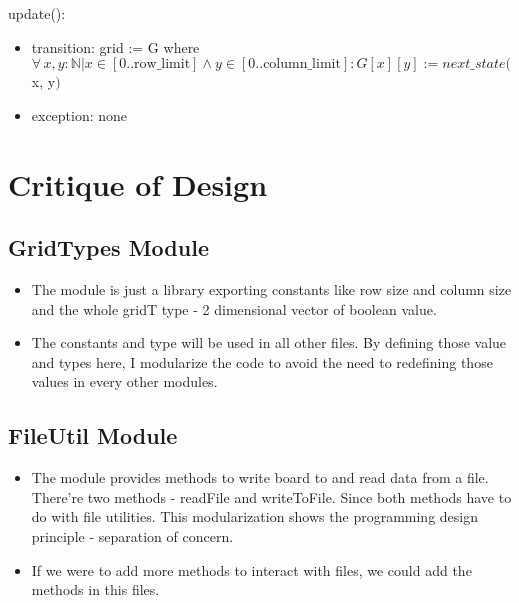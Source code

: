 \documentclass[12pt]{article}
\begin{document}
\noindent update():
\begin{itemize}
\item transition: grid := G where 
$\forall\, x, y: \mathbb{N} | x \in [0..\text{row\_limit}] \wedge y \in [0..\text{column\_limit}]:  G[x][y] :=  next\_state($x, y$)$ \\

\item exception: none

\end{itemize}

\newpage

\section*{Critique of Design}

\subsection*{GridTypes Module}

\begin{itemize}
\item The module is just a library exporting constants like row size and column size and the whole gridT type - 2 dimensional vector of boolean value.

\item The constants and type will be used in all other files.  By defining those value and types here, I modularize the code to avoid the need to redefining those values in every other modules.

\end{itemize}

\subsection*{FileUtil Module}

\begin{itemize}
\item The module provides methods to write board to and read data from a file. There're two methods - readFile and writeToFile. Since both methods have to do with file utilities. This modularization shows the programming design principle - separation of concern. 

\item If we were to add more methods to interact with files, we could add the methods in this files. 

\end{itemize}
\end{document}
